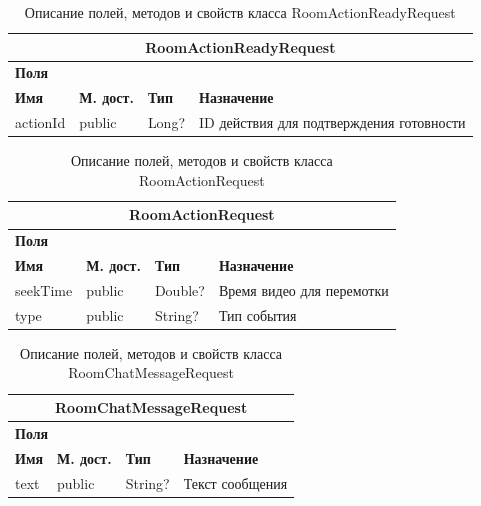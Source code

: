 \documentclass{../includes/TechDoc}
\begin{document}
    \begin{table}[h]
        \caption{\label{tab:class-WebsocketEventListener-table}Описание полей, методов и свойств класса RoomActionReadyRequest}
        \begin{tabularx}{\textwidth}{|l|l|l|X|}
            \hline
            \multicolumn{4}{|c|}{RoomActionReadyRequest} \\ \hline
            \multicolumn{4}{|l|}{\textbf{Поля}} \\ \hline
            \textbf{Имя} & \textbf{М. дост.} & \textbf{Тип} & \textbf{Назначение}                      \\ \hline
            actionId     & public            & Long?        & ID действия для подтверждения готовности \\ \hline
        \end{tabularx}
    \end{table}

    \begin{table}[h]
        \caption{\label{tab:class-WebsocketEventListener-table}Описание полей, методов и свойств класса RoomActionRequest}
        \begin{tabularx}{\textwidth}{|l|l|l|X|}
            \hline
            \multicolumn{4}{|c|}{RoomActionRequest} \\ \hline
            \multicolumn{4}{|l|}{\textbf{Поля}} \\ \hline
            \textbf{Имя} & \textbf{М. дост.} & \textbf{Тип} & \textbf{Назначение}       \\ \hline
            seekTime     & public            & Double?      & Время видео для перемотки \\ \hline
            type         & public            & String?      & Тип события               \\ \hline
        \end{tabularx}
    \end{table}

    \begin{table}[h]
        \caption{\label{tab:class-WebsocketEventListener-table}Описание полей, методов и свойств класса RoomChatMessageRequest}
        \begin{tabularx}{\textwidth}{|l|l|l|X|}
            \hline
            \multicolumn{4}{|c|}{RoomChatMessageRequest} \\ \hline
            \multicolumn{4}{|l|}{\textbf{Поля}} \\ \hline
            \textbf{Имя} & \textbf{М. дост.} & \textbf{Тип} & \textbf{Назначение} \\ \hline
            text         & public            & String?      & Текст сообщения     \\ \hline
        \end{tabularx}
    \end{table}
\end{document}

